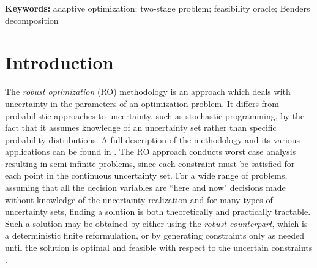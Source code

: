 \documentclass[12pt,x11names]{article}
\theoremstyle{definition}
\begin{document}

{\bf Keywords:} adaptive optimization; two-stage problem; feasibility oracle; Benders decomposition

\section{Introduction}
The \emph{robust optimization} (RO) methodology is an approach which deals with uncertainty in the parameters of an optimization problem. It differs from probabilistic approaches to uncertainty, such as stochastic programming, by the fact that it assumes knowledge of an uncertainty set rather than specific probability distributions. A full description of the methodology and its various applications can be found in \citep{BenTal2009,Bertsimas2011}. The RO approach conducts worst case analysis resulting in semi-infinite problems, since each constraint must be satisfied for each point in the continuous uncertainty set. For a wide range of problems, assuming that all the decision variables are ``here and now" decisions made without knowledge of the uncertainty realization and for many types of uncertainty sets, finding a solution is both theoretically and practically tractable. Such a solution may be obtained by either using the \emph{robust counterpart}, which is a deterministic finite reformulation, or by generating constraints only as needed until the solution
is optimal and feasible with respect to the uncertain constraints \citep{Fischetti2012}.
\end{document}
